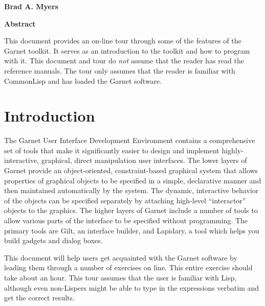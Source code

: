 \begin{titlepage}
\begin{titlebox}
\vspace{0.6 inch}

{\bf Brad A. Myers}
\vspace{0.3 line}
\value{date}
\end{titlebox}
\vspace{0.5 inch}
\begin{center}
{\bf Abstract}\end{center}
\begin{text}
This document provides an on-line tour through some of the features of the
Garnet toolkit.  It serves as an introduction to the toolkit and how to
program with it.  This document and tour do {\it not} assume that the reader
has read the reference manuals.  The tour only assumes that the reader is
familiar with CommonLisp and has loaded the Garnet software.

\vspace{0.5 inch}

\end{text}
\end{titlepage}




\chapter{Introduction}
The Garnet User Interface Development Environment contains a comprehensive
set of tools that make it significantly easier to design and implement
highly-interactive, graphical, direct manipulation user interfaces.  The
lower layers of Garnet provide an object-oriented, constraint-based
graphical system that allows properties of graphical objects to be
specified in a simple, declarative manner and then maintained automatically
by the system.  The dynamic, interactive behavior of the objects can be
specified separately by attaching high-level ``interactor'' objects to the
graphics.  The higher layers of Garnet include a number of tools to allow
various parts of the interface to be specified without programming.
The primary tools are Gilt, an interface builder, and Lapidary, a tool which
helps you build gadgets and dialog boxes.

This document will help users get acquainted with the Garnet software by
leading them through a number of exercises on line.  This entire exercise
should take about an hour.  This tour assumes that the user is familiar
with Lisp, although even non-Lispers might be able to type in the
expressions verbatim and get the correct results.

